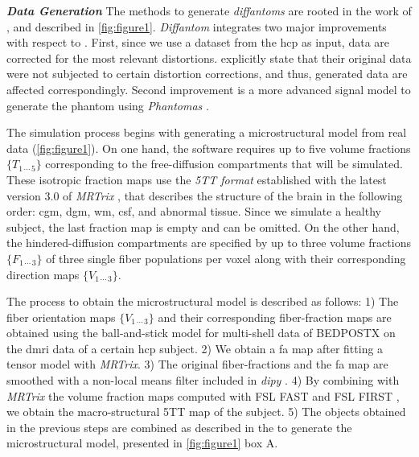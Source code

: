 \documentclass[english]{frontiers/frontiersSCNS} %
\begin{document}
\noindent\textbf{\textit{Data Generation\textcolon}\label{sec:data_generation}}
The methods to generate \emph{diffantoms} are rooted in the work of \cite{wilkins_fiber_2014}, and
  described in \autoref{fig:figure1}.
\emph{Diffantom} integrates two major improvements with respect to \citep{wilkins_fiber_2014}.
First, since we use a dataset from the \gls*{hcp} as input, data are corrected for the most relevant distortions.
\cite{wilkins_fiber_2014} explicitly state that their original data were not subjected to certain distortion
  corrections, and thus, generated data are affected correspondingly.
Second improvement is a more advanced signal model to generate the phantom using
  \emph{Phantomas} \citep{caruyer_Phantomas_2014}.

The simulation process begins with generating a microstructural model from real data (\autoref{fig:figure1}).
On one hand, the software requires up to five volume fractions $\{T_{1\,\cdots\,5}\}$ corresponding to the free-diffusion
  compartments that will be simulated.
These isotropic fraction maps use the \emph{5TT format} established with the latest version 3.0 of
  \emph{MRTrix} \citep{tournier_mrtrix_2012}, that describes the structure of the brain in the following
  order: \gls*{cgm}, \gls*{dgm}, \gls*{wm}, \gls*{csf}, and abnormal tissue.
Since we simulate a healthy subject, the last fraction map is empty and can be omitted.
On the other hand, the hindered-diffusion compartments are specified by up to three volume fractions $\{F_{1\,\cdots\,3}\}$
  of three single fiber populations per voxel along with their corresponding direction maps $\{V_{1\,\cdots\,3}\}$.

The process to obtain the microstructural model is described as follows:
1) The fiber orientation maps $\{V_{1\,\cdots\,3}\}$ and their corresponding fiber-fraction maps are
  obtained using the ball-and-stick model for multi-shell data of BEDPOSTX \citep{jbabdi_modelbased_2012}
  on the \gls*{dmri} data of a certain \gls*{hcp} subject.
2) We obtain a \gls*{fa} map after fitting a tensor model with \emph{MRTrix}.
3) The original fiber-fractions and the \gls*{fa} map are smoothed with a non-local means filter included
  in \emph{dipy} \citep{garyfallis_dipy_2011}.
4) By combining with \emph{MRTrix} the volume fraction maps computed with FSL FAST \citep{zhang_segmentation_2001} and
  FSL FIRST \citep{patenaude_bayesian_2011}, we obtain the macro-structural 5TT map of the subject.
5) The objects obtained in the previous steps are combined as described in the  to generate the
  microstructural model, presented in \autoref{fig:figure1} box A.
\end{document}
